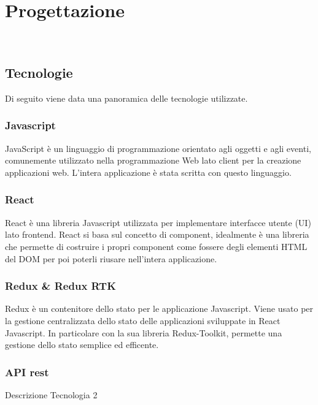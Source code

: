 
\chapter{Progettazione}
\label{cap:progettazione-codifica}

\\

\section{Tecnologie}
\label{sec:tecnologie-strumenti}

Di seguito viene data una panoramica delle tecnologie utilizzate.

\subsection*{Javascript}
JavaScript è un linguaggio di programmazione orientato agli oggetti e agli eventi, comunemente utilizzato nella programmazione Web lato client per la creazione applicazioni web. L'intera applicazione è stata scritta con questo linguaggio.

\subsection*{React}
React è una libreria Javascript utilizzata per implementare interfacce utente (UI) lato frontend. React si basa sul concetto di component, idealmente è una libreria che permette di costruire i propri component come fossere degli elementi HTML del DOM per poi poterli riusare nell'intera applicazione.

\subsection*{Redux \& Redux RTK}
Redux è un contenitore dello stato per le applicazione Javascript. Viene usato per la gestione centralizzata dello stato delle applicazioni sviluppate in React Javascript. In particolare con la sua libreria Redux-Toolkit, permette una gestione dello stato semplice ed efficente.

\subsection*{API rest}
Descrizione Tecnologia 2

